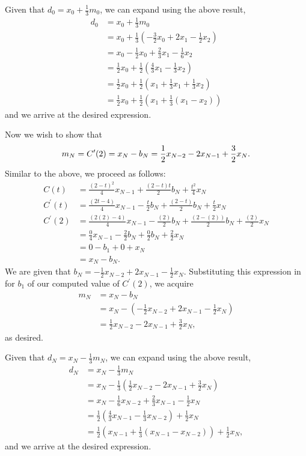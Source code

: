 \documentclass[paper=a4, fontsize=11pt]{scrartcl} %
\begin{document}
Given that $d_0 = x_0 + \frac{1}{3}m_0$, we can expand using the above result,
\begin{align*}
    d_0 &= x_0 + \frac{1}{3}m_0 \\
        &= x_0 + \frac{1}{3}(-\frac{3}{2}x_0 + 2x_1 -\frac{1}{2}x_2) \\
        &= x_0 - \frac{1}{2}x_0 + \frac{2}{3}x_1 - \frac{1}{6}x_2 \\
        &= \frac{1}{2}x_0 + \frac{1}{2}(\frac{4}{3}x_1 - \frac{1}{3}x_2) \\
        &= \frac{1}{2}x_0 + \frac{1}{2}(x_1 + \frac{1}{3}x_1 + \frac{1}{3}x_2) \\
        &= \frac{1}{2}x_0 + \frac{1}{2}(x_1 + \frac{1}{3}(x_1 - x_2))
\end{align*}
and we arrive at the desired expression.

Now we wish to show that
\begin{equation}
    m_N = C^\prime (2) = x_N - b_N = \frac{1}{2}x_{N-2} - 2x_{N-1} + \frac{3}{2}x_N. \notag
\end{equation}
Similar to the above, we proceed as follows:
\begin{align*}
    C(t) &= \frac{(2 - t)^2}{4} x_{N-1} + \frac{(2-t)t}{2} b_N + \frac{t^2}{4}x_N \\
    C^\prime (t) &= \frac{(2t - 4)}{4}x_{N-1} - \frac{t}{2}b_N + \frac{(2-t)}{2}b_N + \frac{t}{2}x_N \\
    C^\prime(2) &= \frac{(2(2) - 4)}{4}x_{N-1} - \frac{(2)}{2}b_N + \frac{(2-(2))}{2}b_N + \frac{(2)}{2}x_N \\
                &= \frac{0}{4}x_{N-1} - \frac{2}{2}b_N + \frac{0}{2}b_N + \frac{2}{2}x_N \\
                &= 0 -b_1 + 0 + x_N \\
                &= x_N - b_N.
\end{align*}
We are given that $b_N = -\frac{1}{2}x_{N-2} + 2x_{N-1} -\frac{1}{2}x_N$.
Substituting this expression in for $b_1$ of our computed value of
$C^\prime(2)$, we acquire
\begin{align*}
    m_N &= x_N - b_N \\
        &= x_N - (-\frac{1}{2}x_{N-2} + 2x_{N-1} -\frac{1}{2}x_N) \\
        &= \frac{1}{2}x_{N-2} - 2x_{N-1} +\frac{3}{2}x_N ,
\end{align*}
as desired.

Given that $d_N = x_N - \frac{1}{3}m_N$, we can expand using the above result,
\begin{align*}
    d_N &= x_N - \frac{1}{3}m_N \\
        &= x_N - \frac{1}{3}(\frac{1}{2}x_{N-2} - 2x_{N-1} +\frac{3}{2}x_N) \\
        &= x_N - \frac{1}{6}x_{N-2} + \frac{2}{3}x_{N-1} - \frac{1}{2}x_N \\
        &= \frac{1}{2}(\frac{4}{3}x_{N-1} - \frac{1}{3}x_{N-2})+ \frac{1}{2}x_N\\
        &= \frac{1}{2}(x_{N-1} + \frac{1}{3}(x_{N-1}-x_{N-2}))+ \frac{1}{2}x_N,
\end{align*}
and we arrive at the desired expression.
\end{document}
